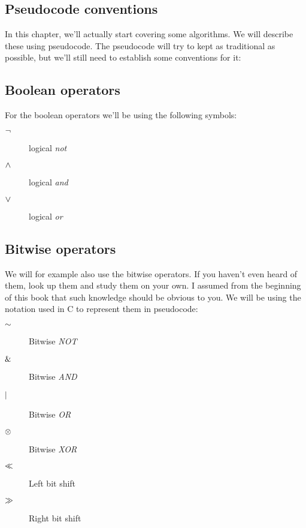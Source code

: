 \begin{refsection}
\section{Pseudocode conventions}
\label{sec:pseud-conv}

In this chapter, we'll actually start covering some algorithms. We
will describe these using pseudocode. The pseudocode will try to kept
as traditional as possible, but we'll still need to establish some
conventions for it:

\subsection{Boolean operators}
\label{sec:boolean-operators}

For the boolean operators we'll be using the following
symbols:

\begin{description}
\item[$\neg$] logical \textit{not}
\item[$\wedge$] logical \textit{and}
\item[$\vee$] logical \textit{or}
\end{description}

\subsection{Bitwise operators}
\label{sec:bitwise-operators}

\newcommand{\C}{\textsc{C}}

We will for example also use the bitwise operators. If you
haven't even heard of them, look up them and study them on your own. I
assumed from the beginning of this book that such knowledge should be
obvious to you. We will be using the notation used in \C{} to
represent them in pseudocode:


\begin{description}
\item[$\mathord{\sim}$] Bitwise \textit{NOT}
\item[$\mathrel{\&}$] Bitwise \textit{AND}
\item[$\mathrel{|}$] Bitwise \textit{OR}
\item[$\mathrel{\otimes}$] Bitwise \textit{XOR}
\item[$\ll$] Left bit shift
\item[$\gg$] Right bit shift
\end{description}


\end{refsection}
